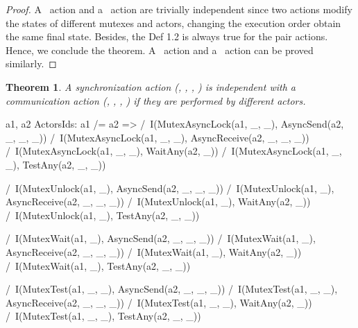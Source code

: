 \documentclass[a4paper,11pt]{article}
\theoremstyle{break}
\newtheorem{theorem}{Theorem}[section]
\begin{document}
\begin{proof}
	A \mutexunlock~action and a \mutexwait~action are trivially independent since two actions modify the states of different mutexes and actors, changing the execution order obtain the same final state. Besides, the Def 1.2 is always true for the pair actions. Hence, we conclude the theorem. A \mutexunlock~action and a \mutextest~action can be proved similarly. 
\end{proof}

\begin{theorem}
A synchronization action (\mutexlock, \mutexunlock, \mutextest, \mutexwait) is independent with a communication action (\asynsend, \asynreceive, \test, \wait) if they are performed by different actors. 
\end{theorem}
\begin{tla}
\forall a1, a2 \in ActorsIds: a1 /= a2 =>
		/\ I(MutexAsyncLock(a1, _, _), AsyncSend(a2, _, _, _))
		/\ I(MutexAsyncLock(a1, _, _), AsyncReceive(a2, _, _, _))  
		/\ I(MutexAsyncLock(a1, _, _), WaitAny(a2, _))   
		/\ I(MutexAsyncLock(a1, _, _), TestAny(a2, _, _))   

		/\ I(MutexUnlock(a1, _), AsyncSend(a2, _, _, _))
		/\ I(MutexUnlock(a1, _), AsyncReceive(a2, _, _, _))  
		/\ I(MutexUnlock(a1, _), WaitAny(a2, _))   
		/\ I(MutexUnlock(a1, _), TestAny(a2, _, _))

		/\ I(MutexWait(a1, _), AsyncSend(a2, _, _, _))
		/\ I(MutexWait(a1, _), AsyncReceive(a2, _, _, _))
		/\ I(MutexWait(a1, _), WaitAny(a2, _))
		/\ I(MutexWait(a1, _), TestAny(a2, _, _))

		/\ I(MutexTest(a1, _, _), AsyncSend(a2, _, _, _))
		/\ I(MutexTest(a1, _, _), AsyncReceive(a2, _, _, _))
		/\ I(MutexTest(a1, _, _), WaitAny(a2, _))   
		/\ I(MutexTest(a1, _, _), TestAny(a2, _, _))   
\end{tla}
\end{document}
